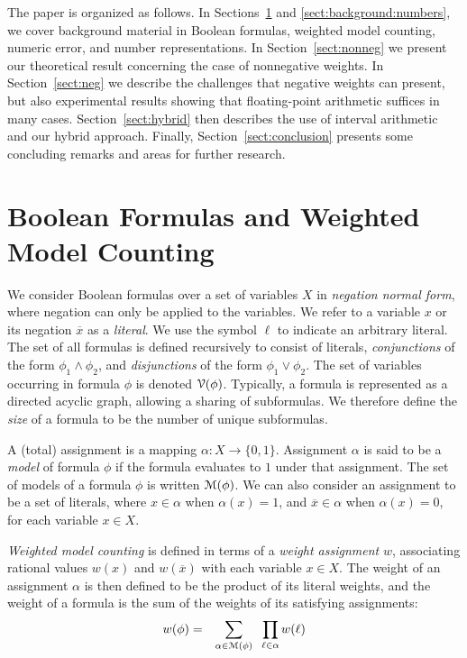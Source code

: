 \documentclass[letterpaper,USenglish,cleveref, autoref, thm-restate]{lipics-v2021}
\newcommand{\obar}[1]{\overline{#1}}
\newcommand{\lit}{\ell}
\newcommand{\varset}{X}
\newcommand{\dependencyset}{{\cal V}}
\newcommand{\assign}{\alpha}
\newcommand{\modelset}{{\cal M}}
\begin{document}
The paper is organized as follows.  In
Sections~\ref{sect:background:boolean} and
\ref{sect:background:numbers}, we cover background material in Boolean
formulas, weighted model counting, numeric error, and number
representations.  In Section~\ref{sect:nonneg} we present our
theoretical result concerning the case of nonnegative weights.  In
Section~\ref{sect:neg} we describe the challenges that negative
weights can present, but also experimental results showing that
floating-point arithmetic suffices in many cases.
Section~\ref{sect:hybrid} then describes the use of interval
arithmetic and our hybrid approach.  
Finally, Section~\ref{sect:conclusion}
presents some concluding remarks and  areas for
further research.


\section{Boolean Formulas and Weighted Model Counting}
\label{sect:background:boolean}

We consider Boolean formulas over a set of variables $\varset$ in
\emph{negation normal form}, where negation can only be applied to the
variables.  We refer to a variable $x$ or its negation $\obar{x}$ as a
\emph{literal}.  We use the symbol $\lit$ to indicate an arbitrary
literal.  The set of all formulas is defined recursively to consist of
literals, \emph{conjunctions} of the form $\phi_1 \land \phi_2$, and
\emph{disjunctions} of the form $\phi_1 \lor \phi_2$.  The set of
variables occurring in formula $\phi$ is denoted
$\dependencyset(\phi)$.  Typically, a formula is represented as a
directed acyclic graph, allowing a sharing of subformulas.  We
therefore define the \emph{size} of a formula to be the number of
unique subformulas.

A (total) assignment is a mapping $\assign \colon \varset \rightarrow
\{0, 1\}$.  Assignment $\assign$ is said to be a \emph{model} of
formula $\phi$ if the formula evaluates to $1$ under that assignment.
The set of models of a formula $\phi$ is written $\modelset(\phi)$.
We can also consider an assignment to be a set of literals, where $x \in \assign$
when $\assign(x) = 1$, and $\obar{x} \in \assign$ when
$\assign(x) = 0$, for each variable $x \in \varset$.

\emph{Weighted model counting} is defined in terms of a \emph{weight
  assignment} $w$, associating rational values $w(x)$ and
$w(\obar{x})$ with each variable $x \in \varset$.
The weight of an
assignment $\assign$ is then defined to be the product of its literal weights, and the weight
of a formula is the sum of the weights of its satisfying assignments:
\begin{eqnarray}
  w(\phi) & = & \sum_{\assign \in \modelset(\phi)} \;\;\prod_{\lit \in \assign} w(\lit) \label{eqn:wmc}
\end{eqnarray}
\end{document}
